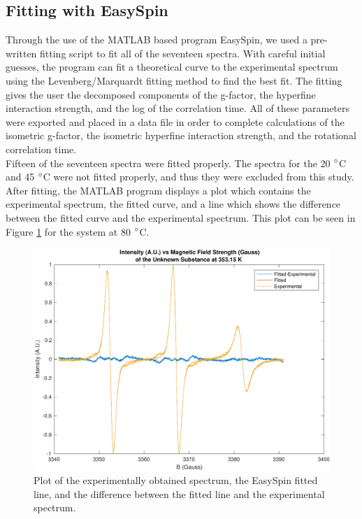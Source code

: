 \documentclass[twocolumn]{article}
\begin{document}
\subsection{Fitting with EasySpin}
Through the use of the MATLAB based program EasySpin, we used a pre-written fitting script to fit all of the seventeen spectra. With careful initial guesses, the program can fit a theoretical curve to the experimental spectrum using the Levenberg/Marquardt fitting method to find the best fit. The fitting gives the user the decomposed components of the g-factor, the hyperfine interaction strength, and the log of the correlation time. All of these parameters were exported and placed in a data file in order to complete calculations of the isometric g-factor, the isometric hyperfine interaction strength, and the rotational correlation time. \\
\indent
Fifteen of the seventeen spectra were fitted properly. The spectra for the 20 $\degree$C and 45 $\degree$C were not fitted properly, and thus they were excluded from this study. \\
\indent
After fitting, the MATLAB program displays a plot which contains the experimental spectrum, the fitted curve, and a line which shows the difference between the fitted curve and the experimental spectrum. This plot can be seen in Figure  \ref{fig:fig1} for the system at 80 $\degree$C.
\begin{figure}[h]
	\includegraphics[scale=0.35]{H80C1_Best_Fit_for_Report_try}
	\caption{Plot of the experimentally obtained spectrum, the EasySpin fitted line, and the difference between the fitted line and the experimental spectrum.\label{fig:fig1}}
\end{figure}
\end{document}
